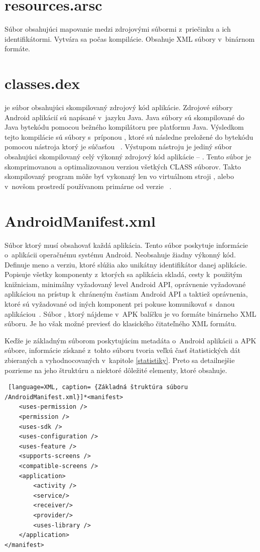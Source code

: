 \section{resources.arsc}
\label{resources.arsc}
Súbor obsahujúci mapovanie medzi zdrojovými súbormi  z~priečinku  a ich identifikátormi.  Vytvára sa počas kompilácie. Obsahuje XML súbory v~binárnom formáte.

\section{classes.dex}
\label{classes.dex}
 je súbor obsahujúci skompilovaný zdrojový kód aplikácie.  Zdrojové súbory Android aplikácií sú napísané v~jazyku Java. Java súbory sú skompilované do Java bytekódu pomocou bežného kompilátoru pre platformu Java. Výsledkom tejto kompilácie sú súbory s~príponou , ktoré sú následne preložené do  bytekódu pomocou nástroja  ktorý je súčasťou ~\cite{Reddy2014}. Výstupom nástroju  je jediný súbor obsahujúci skompilovaný celý výkonný zdrojový kód aplikácie -- . Tento súbor je skomprimovanou a optimalizovanou verziou všetkých CLASS súborov. Takto skompilovaný program môže byť vykonaný len vo virtuálnom stroji , alebo v~novšom prostredí  používanom primárne od verzie ~\cite{dalvik}.

\section{AndroidManifest.xml} 
\label{AndroidManifest.xml}
Súbor ktorý musí obsahovať každá aplikácia. Tento súbor poskytuje informácie o~aplikácii operačnému systému Android. Neobsahuje žiadny výkonný kód. Definuje meno a verziu, ktoré slúžia ako unikátny identifikátor danej aplikácie. Popisuje všetky komponenty z~ktorých sa aplikácia skladá, cesty k~použitým knižniciam, minimálny vyžadovaný level Android API, oprávnenie vyžadované aplikáciou na prístup k~chráneným častiam Android API a taktiež oprávnenia, ktoré sú vyžadované od iných komponent pri pokuse komunikovať s~danou aplikáciou~\cite{appManifest}. Súbor , ktorý nájdeme v~APK balíčku je vo formáte binárneho XML súboru. Je ho však možné previesť do klasického čitateľného XML formátu.

Keďže  je základným súborom poskytujúcim metadáta o~Android aplikácii a APK súbore, informácie získané z~tohto súboru tvoria veľkú časť štatistických dát zbieraných a vyhodnocovaných v~kapitole \ref{statistiky}. Preto sa detailnejšie pozrieme na jeho štruktúru a niektoré dôležité elementy, ktoré obsahuje.
\begin{lstlisting} [language=XML, caption= {Základná štruktúra súboru /AndroidManifest.xml}]*<manifest>
    <uses-permission />
    <permission />
    <uses-sdk />
    <uses-configuration />  
    <uses-feature />  
    <supports-screens />  
    <compatible-screens />  
    <application>
        <activity />
        <service/>
        <receiver/>
        <provider/>
        <uses-library />
    </application>
</manifest>
\end{lstlisting}

